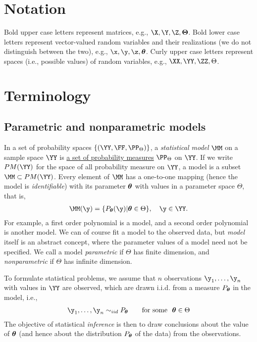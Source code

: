 \documentclass{book}
\begin{document}
\section{Notation}
Bold upper case letters represent matrices, e.g., $\X, \Y, \Z, \bTheta$. Bold lower case letters represent vector-valued random variables and their realizations (we do not distinguish between the two), e.g., $\x, \y, \z, \btheta$. Curly upper case letters represent spaces (i.e., possible values) of random variables, e.g., $\XX, \YY, \ZZ, \Theta$.

\section{Terminology}
\subsection{Parametric and nonparametric models}
In a set of probability spaces $\{(\YY, \FF, \PP_\Theta)\}$, a {\em{statistical model}} $\MM$ on a sample space $\YY$ is {\underline{a set of probability measures}} $\PP_\Theta$ on $\YY$. If we write $PM(\YY)$ for the space of all probability measure on $\YY$, a model is a subset $\MM \subset PM(\YY)$. Every element of $\MM$ has a one-to-one mapping (hence the model is {\em{identifiable}}) with its parameter ${\boldsymbol{\theta}}$ with values in a parameter space $\Theta$, that is,
\begin{align}
\MM(\y) = \{P_\btheta(\y) | \btheta \in \Theta\},\quad \y \in \YY.
\end{align}
For example, a first order polynomial is a model, and a second order polynomial is another model. We can of course fit a model to the observed data, but {\em{model}} itself is an abstract concept, where the parameter values of a model need not be specified. We call a model {\em{parametric}} if $\Theta$ has finite dimension, and {\em{nonparametric}} if $\Theta$ has infinite dimension.

To formulate statistical problems, we assume that $n$ observations $\y_1,\dots,\y_n$ with values in $\YY$ are observed, which are drawn i.i.d. from a measure $P_{\boldsymbol{\theta}}$ in the model, i.e.,
\begin{align}
\y_1, \dots, \y_n \sim_{iid} P_\btheta \qquad \text{for some}~~ \btheta \in \Theta
\end{align}
The objective of statistical {\em{inference}} is then to draw conclusions about the value of ${\boldsymbol{\theta}}$ (and hence about the distribution $P_{\boldsymbol{\theta}}$ of the data) from the observations.
\end{document}
